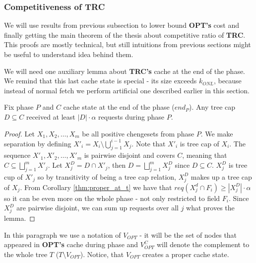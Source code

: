 \subsubsection{Competitiveness of TRC}
We will use results from previous subsection to lower bound \textbf{OPT's} cost 
and finally getting the main theorem of the thesis about competitive ratio of 
\textbf{TRC}. This proofs are mostly technical, but still intuitions from 
previous sections might be useful to understand idea behind them.

We will need one auxiliary lemma about \textbf{TRC's} cache at the end of the 
phase. We remind that this last cache state is special - its size exceeds 
$k_{ONL}$, because instead of normal fetch we perform artificial one 
described earlier in this section.  
\begin{lemma}
Fix phase $P$ and $C$ cache state at the end of the phase ($end_P$). Any tree 
cap $D \subseteq C$ received at least $|D| \cdot \alpha$ requests during phase 
$P$.
\label{thm:lots_of_req_in_tc_end_of_p}
\end{lemma}
\begin{proof}
Let $X_1, X_2, \ldots, X_m$ be all positive chengesets from phase $P$. We make 
separation by defining $X'_i = X_i \setminus \bigcup_{j=1}^{i-1} X_j$. Note 
that $X'_i$ is tree cap of $X_i$. The sequence $X'_1, X'_2, \ldots, X'_m$ is 
pairwise disjoint and covers $C$, meaning that $C \subseteq \bigsqcup_{j=1}^m 
X'_j$. Let $X_j^D = D \cap X'_j$, then $D = \bigsqcup_{j=1}^m X_j^D$ since $D 
\subseteq C$. $X_j^D$ is tree cup of $X'_j$ so by transitivity of 
being a tree cap relation, $X_j^D$ makes up a tree cap of $X_j$. From Corollary 
\ref{thm:proper_at_t} we have that $req(X_j^d \cap F_i) \geq |X_j^D| \cdot 
\alpha$ so it can be even more on the whole phase - not only restricted to 
field $F_i$. Since $X_j^D$ are pairwise disjoint, we can sum up requests over 
all $j$ what proves the lemma.
\end{proof}

In this paragraph we use a notation of $V_{OPT}$ - it will be the set of nodes 
that appeared in \textbf{OPT's} cache during phase and $V_{OPT}^C$ will 
denote the complement to the whole tree $T$ ($T \setminus V_{OPT}$). Notice, 
that $V_{OPT}$ creates a proper cache state.

